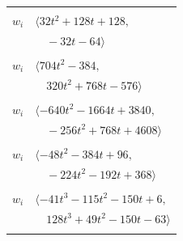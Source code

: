 \documentclass[11pt]{article}
\begin{document}
\begin{longtable}{@{}ll@{}}
\addlinespace[2pt]
\multicolumn{2}{@{}p{0.97\textwidth}@{}}{$i=32$, $D_i=16$, $\rho_{ij}$: $2{:}2, \allowbreak 7{:}1, \allowbreak 20{:}2, \allowbreak 23{:}2, \allowbreak 25{:}2, \allowbreak 27{:}2, \allowbreak 42{:}1, \allowbreak 66{:}1, \allowbreak 69{:}1$}\\
$w_i$ & $\langle 32t^{2}+128t+128,$\\
 & $\quad -32t-64\rangle$\\
\addlinespace[2pt]
\multicolumn{2}{@{}p{0.97\textwidth}@{}}{$i=33$, $D_i=64$, $\rho_{ij}$: $5{:}1, \allowbreak 8{:}2, \allowbreak 12{:}2, \allowbreak 13{:}2, \allowbreak 30{:}1, \allowbreak 41{:}1, \allowbreak 43{:}1, \allowbreak 54{:}2, \allowbreak 64{:}2, \allowbreak 68{:}2, \allowbreak 69{:}2$}\\
$w_i$ & $\langle 704t^{2}-384,$\\
 & $\quad 320t^{2}+768t-576\rangle$\\
\addlinespace[2pt]
\multicolumn{2}{@{}p{0.97\textwidth}@{}}{$i=34$, $D_i=64$, $\rho_{ij}$: $6{:}1, \allowbreak 10{:}2, \allowbreak 12{:}2, \allowbreak 15{:}2, \allowbreak 36{:}1, \allowbreak 44{:}1, \allowbreak 45{:}2, \allowbreak 46{:}1, \allowbreak 54{:}1, \allowbreak 65{:}1, \allowbreak 66{:}2, \allowbreak 68{:}2$}\\
$w_i$ & $\langle -640t^{2}-1664t+3840,$\\
 & $\quad -256t^{2}+768t+4608\rangle$\\
\addlinespace[2pt]
\multicolumn{2}{@{}p{0.97\textwidth}@{}}{$i=35$, $D_i=16$, $\rho_{ij}$: $0{:}1, \allowbreak 4{:}1, \allowbreak 6{:}2, \allowbreak 8{:}1, \allowbreak 15{:}1, \allowbreak 26{:}2, \allowbreak 27{:}2, \allowbreak 29{:}2, \allowbreak 62{:}2, \allowbreak 67{:}1$}\\
$w_i$ & $\langle -48t^{2}-384t+96,$\\
 & $\quad -224t^{2}-192t+368\rangle$\\
\addlinespace[2pt]
\multicolumn{2}{@{}p{0.97\textwidth}@{}}{$i=36$, $D_i=16$, $\rho_{ij}$: $5{:}2, \allowbreak 8{:}2, \allowbreak 27{:}2, \allowbreak 29{:}1, \allowbreak 34{:}2, \allowbreak 47{:}1, \allowbreak 52{:}1, \allowbreak 57{:}1, \allowbreak 67{:}2$}\\
$w_i$ & $\langle -41t^{3}-115t^{2}-150t+6,$\\
 & $\quad 128t^{3}+49t^{2}-150t-63\rangle$\\
\addlinespace[2pt]
\multicolumn{2}{@{}p{0.97\textwidth}@{}}{$i=37$, $D_i=16$, $\rho_{ij}$: $1{:}2, \allowbreak 11{:}1, \allowbreak 40{:}1, \allowbreak 44{:}2, \allowbreak 45{:}2, \allowbreak 53{:}2, \allowbreak 58{:}1, \allowbreak 64{:}1, \allowbreak 65{:}1$}\\

\end{longtable}
\end{document}

